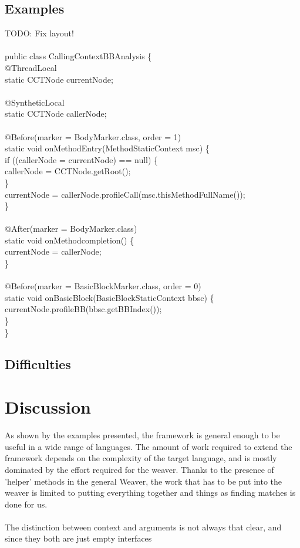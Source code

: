 \documentclass[a4paper]{report}
\begin{document}
\section{Examples}
TODO: Fix layout!\\
\\
public class CallingContextBBAnalysis \{\\
@ThreadLocal\\
static CCTNode currentNode;\\
\\
@SyntheticLocal\\
static CCTNode callerNode;\\
\\
@Before(marker = BodyMarker.class, order = 1)\\
static void onMethodEntry(MethodStaticContext msc) \{\\
if ((callerNode = currentNode) == null) \{\\
callerNode = CCTNode.getRoot();\\
\}\\
currentNode = callerNode.profileCall(msc.thisMethodFullName());\\
\}\\
\\
@After(marker = BodyMarker.class)\\
static void onMethodcompletion() \{\\
currentNode = callerNode;\\
\}\\
\\
@Before(marker = BasicBlockMarker.class, order = 0)\\
static void onBasicBlock(BasicBlockStaticContext bbsc) \{\\
currentNode.profileBB(bbsc.getBBIndex());\\
\}\\
\}

\section{Difficulties}


\chapter{Discussion}
As shown by the examples presented, the framework is general enough to be useful in a wide range of languages. The amount of work required to extend the framework depends on the complexity of the target language, and is mostly dominated by the effort required for the weaver. Thanks to the presence of 'helper' methods in the general Weaver, the work that has to be put into the weaver is limited to putting everything together and things as finding matches is done for us.\\
\\
The distinction between context and arguments is not always that clear, and since they both are just empty interfaces
\end{document}
